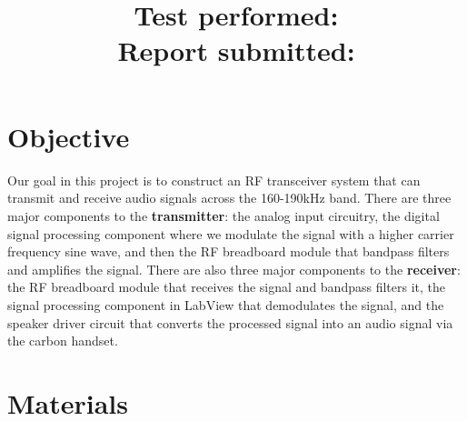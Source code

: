 \documentclass[10pt]{article}
\title{
    \textbf{\courseTitle} \\
    \textbf{\documentTitle} \\
    \bigskip
    \textbf{\large{Test performed: \testDate}} \\
    \textbf{\large{Report submitted: \reportDate}} \\
    \bigskip
    \bigskip
}
\author{\documentAuthor}
\date{}
\begin{document}
\maketitle

\newpage

\section{Objective}

Our goal in this project is to construct an RF transceiver system that can transmit and receive audio signals across the 160-190kHz band. There are three major components to the \textbf{transmitter}: the analog input circuitry, the digital signal processing component where we modulate the signal with a higher carrier frequency sine wave, and then the RF breadboard module that bandpass filters and amplifies the signal. There are also three major components to the \textbf{receiver}: the RF breadboard module that receives the signal and bandpass filters it, the signal processing component in LabView that demodulates the signal, and the speaker driver circuit that converts the processed signal into an audio signal via the carbon handset. 

\medskip



\section{Materials}
\end{document}
